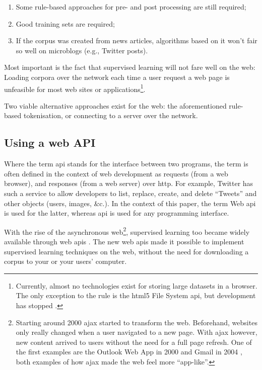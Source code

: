 \begin{enumerate}
\begin{enumerate}
\item
  Some rule-based approaches for pre- and post processing are still
  required;
\item
  Good training sets are required;
\item
  If the corpus was created from news articles, algorithms based on it
  won't fair so well on microblogs (e.g., Twitter posts).
\end{enumerate}

Most important is the fact that supervised learning will not fare well
on the web: Loading corpora over the network each time a user request a
web page is unfeasible for most web sites or applications\footnote{Currently,
  almost no technologies exist for storing large datasets in a browser.
  The only exception to the rule is the \acrshort{html5} File System
  \acrshort{api}, but development has stopped
  \autocite{w3.org-filesystem-dead}.}.

Two viable alternative approaches exist for the web: the aforementioned
rule-based tokenisation, or connecting to a server over the network.

\subsection{Using a web API}\label{using-a-web}

Where the term \gls{api} stands for the interface between two programs,
the term is often defined in the context of web development as requests
(from a web browser), and responses (from a web server) over \gls{http}.
For example, Twitter has such a service to allow developers to list,
replace, create, and delete ``Tweets'' and other objects (users, images,
\&c.). In the context of this paper, the term Web \gls{api} is used for
the latter, whereas \gls{api} is used for any programming interface.

With the rise of the asynchronous web\footnote{Starting around 2000
  \gls{ajax} started to transform the web. Beforehand, websites only
  really changed when a user navigated to a new page. With \gls{ajax}
  however, new content arrived to users without the need for a full page
  refresh. One of the first examples are the Outlook Web App in 2000
  \autocite{technet-outlook-web-access} and Gmail in 2004
  \autocite{gmailblog-gmail-ajax}, both examples of how \gls{ajax} made
  the web feel more ``app-like''.}, supervised learning too became
widely available through web \glspl{api}
\autocites[e.g.,][]{textteaser-web-api}{wordnet-web-api}{textrazor-web-api}.
The new web \glspl{api} made it possible to implement supervised
learning techniques on the web, without the need for downloading a
corpus to your or your users' computer.


\end{enumerate}
